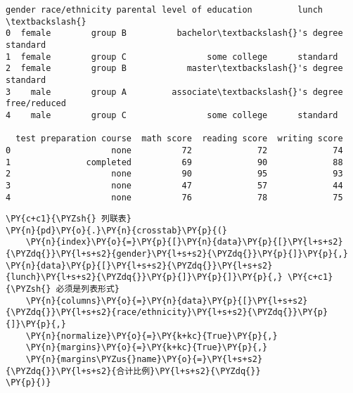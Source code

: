             \begin{tcolorbox}[breakable, size=fbox, boxrule=.5pt, pad at break*=1mm, opacityfill=0]
\begin{Verbatim}[commandchars=\\\{\}]
   gender race/ethnicity parental level of education         lunch  \textbackslash{}
0  female        group B          bachelor\textbackslash{}'s degree      standard
1  female        group C                some college      standard
2  female        group B            master\textbackslash{}'s degree      standard
3    male        group A         associate\textbackslash{}'s degree  free/reduced
4    male        group C                some college      standard

  test preparation course  math score  reading score  writing score
0                    none          72             72             74
1               completed          69             90             88
2                    none          90             95             93
3                    none          47             57             44
4                    none          76             78             75
\end{Verbatim}
\end{tcolorbox}
        
    \begin{tcolorbox}[breakable, size=fbox, boxrule=1pt, pad at break*=1mm,colback=cellbackground, colframe=cellborder]
\begin{Verbatim}[commandchars=\\\{\}]
\PY{c+c1}{\PYZsh{} 列联表}
\PY{n}{pd}\PY{o}{.}\PY{n}{crosstab}\PY{p}{(}
    \PY{n}{index}\PY{o}{=}\PY{p}{[}\PY{n}{data}\PY{p}{[}\PY{l+s+s2}{\PYZdq{}}\PY{l+s+s2}{gender}\PY{l+s+s2}{\PYZdq{}}\PY{p}{]}\PY{p}{,} \PY{n}{data}\PY{p}{[}\PY{l+s+s2}{\PYZdq{}}\PY{l+s+s2}{lunch}\PY{l+s+s2}{\PYZdq{}}\PY{p}{]}\PY{p}{]}\PY{p}{,} \PY{c+c1}{\PYZsh{} 必须是列表形式}
    \PY{n}{columns}\PY{o}{=}\PY{n}{data}\PY{p}{[}\PY{l+s+s2}{\PYZdq{}}\PY{l+s+s2}{race/ethnicity}\PY{l+s+s2}{\PYZdq{}}\PY{p}{]}\PY{p}{,}
    \PY{n}{normalize}\PY{o}{=}\PY{k+kc}{True}\PY{p}{,}
    \PY{n}{margins}\PY{o}{=}\PY{k+kc}{True}\PY{p}{,}
    \PY{n}{margins\PYZus{}name}\PY{o}{=}\PY{l+s+s2}{\PYZdq{}}\PY{l+s+s2}{合计比例}\PY{l+s+s2}{\PYZdq{}}
\PY{p}{)}
\end{Verbatim}
\end{tcolorbox}

